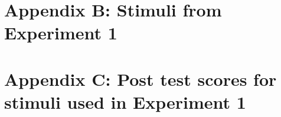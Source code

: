\documentclass{../Dissertate}
\begin{document}
\doublespacing

\begin{appendices}
  \setcounter{secnumdepth}{0}
  
  \graphicspath{{./../Appendices/}}

  \clearpage
  \section{Appendix B: Stimuli from Experiment 1} \label{appendix:exp1_stimuli}
  

  \clearpage
  \section{Appendix C: Post test scores for stimuli used in Experiment 1} \label{appendix:exp1_posttest}
  
\end{appendices}



\end{document}
